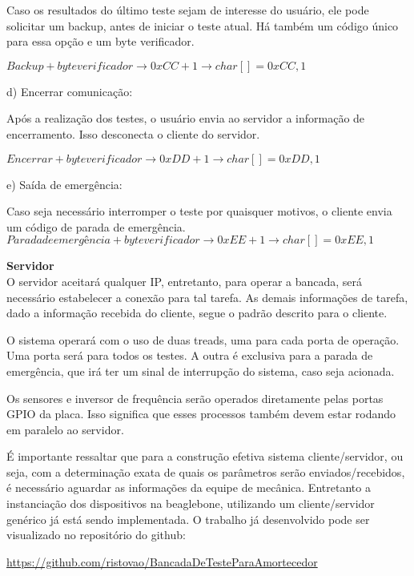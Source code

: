 	Caso os resultados do último teste sejam de interesse do usuário, ele pode solicitar um backup, antes de iniciar o teste atual. Há também um código único para essa opção e um byte verificador.

		\textit{$Backup + byte verificador \rightarrow 0xCC + 1 \rightarrow char[] = {0xCC, 1}$}
		
	d) Encerrar comunicação:

	Após a realização dos testes, o usuário envia ao servidor a informação de encerramento. Isso desconecta o cliente do servidor.

		\textit{$Encerrar + byte verificador \rightarrow 0xDD + 1 \rightarrow char[] = {0xDD, 1}$}
		
	e) Saída de emergência:

	Caso seja necessário interromper o teste por quaisquer motivos, o cliente envia um código de parada de emergência.
		\textit{$Parada de emergência + byte verificador \rightarrow 0xEE + 1 \rightarrow char[] = {0xEE, 1}$}

	\textbf {Servidor}\\
	O servidor aceitará qualquer IP, entretanto, para operar a bancada, será necessário estabelecer a conexão para tal tarefa. As demais informações de tarefa, dado a informação recebida do cliente, segue o padrão descrito para o cliente.

	O sistema operará com o uso de duas treads, uma para cada porta de operação. Uma porta será para todos os testes. A outra é exclusiva para a parada de emergência, que irá ter um sinal de interrupção do sistema, caso seja acionada.

	Os sensores e inversor de frequência serão operados diretamente pelas portas GPIO da placa. Isso significa que esses processos também devem estar rodando em paralelo ao servidor.

	É importante ressaltar que para a construção efetiva sistema cliente/servidor, ou seja, com a determinação exata de quais os parâmetros serão enviados/recebidos, é necessário aguardar as informações da equipe de mecânica. Entretanto a instanciação dos dispositivos na beaglebone, utilizando um cliente/servidor genérico já está sendo implementada. O trabalho já desenvolvido pode ser visualizado no repositório do github:

	\href{https://github.com/ristovao/BancadaDeTesteParaAmortecedor}{https://github.com/ristovao/BancadaDeTesteParaAmortecedor}
